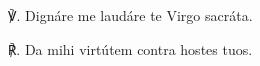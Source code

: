 ℣. Dignáre me laudáre te Virgo sacráta. \tpalleluia

℟. Da mihi virtútem contra hostes tuos. \tpalleluia